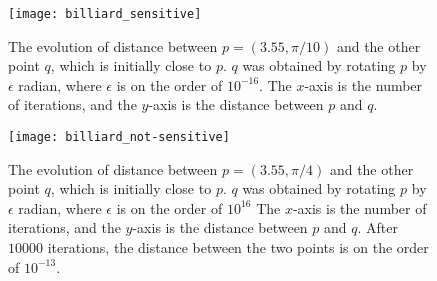 \documentclass[10pt,twoside]{book}
\begin{document}
\begin{figure}[ht]
  \begin{center}
    \texttt{[image: billiard\_sensitive]}
    \caption{The evolution of distance between $p = (3.55, \pi/10)$ and the other point $q$, which is initially close to $p$.
      $q$ was obtained by rotating $p$ by $\epsilon$ radian, where $\epsilon$ is on the order of $10^{-16}$.
      The $x$-axis is the number of iterations, and the $y$-axis is the distance between $p$ and $q$.
    }
    \label{fig:sensitivity1}
  \end{center}
\end{figure}
\begin{figure}[ht]
  \begin{center}
    \texttt{[image: billiard\_not-sensitive]}
    \caption{The evolution of distance between $p = (3.55, \pi/4)$ and the other point $q$, which is initially close to $p$.
      $q$ was obtained by rotating $p$ by $\epsilon$ radian, where $\epsilon$ is on the order of $10^{16}$
      The $x$-axis is the number of iterations, and the $y$-axis is the distance between $p$ and $q$.
      After $10000$ iterations, the distance between the two points is on the order of $10^{-13}$.
    }
    \label{fig:sensitivity2}
  \end{center}
\end{figure}




\printindex
\end{document}
